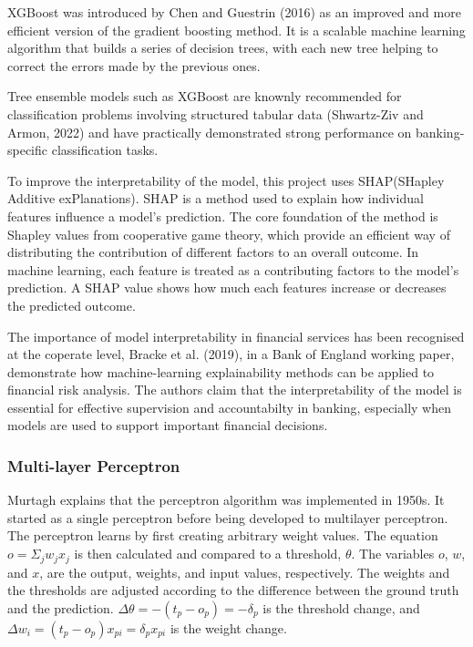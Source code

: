 \documentclass[ %
                    author={Natchalin Iwsakul \\ Inkaphol Siriwongwattana \\ Tanaphan Kummaraphat \\ Patorn Srisupap},
                supervisor={Fernando Moreno-Pino},
                    degree={MSc},
                     title={Propensity Modelling for SME Commercial Lending Using Open Public Data},
                  subtitle={Companies House filings and GDELT media coverage as predictors of first-time borrowing},
                      type={},
                      year={2026}]{dissertation}
\begin{document}
XGBoost was introduced by Chen and Guestrin (2016) as an improved and more efficient version of the gradient boosting method. It is a scalable machine learning algorithm that builds a series of decision trees, with each new tree helping to correct the errors made by the previous ones. 

Tree ensemble models such as XGBoost are knownly recommended for classification problems involving structured tabular data (Shwartz-Ziv and Armon, 2022) and have practically demonstrated strong performance on banking-specific classification tasks.

To improve the interpretability of the model, this project uses SHAP(SHapley Additive exPlanations). SHAP is a method used to explain how individual features influence a model's prediction. The core foundation of the method is Shapley values from cooperative game theory, which provide an efficient way of distributing the contribution of different factors to an overall outcome. 
In machine learning, each feature is treated as a contributing factors to the model's prediction. A SHAP value shows how much each features increase or decreases the predicted outcome.

The importance of model interpretability in financial services has been recognised at the coperate level, Bracke et al. (2019), in a Bank of England working paper, demonstrate how machine-learning explainability methods can be applied to financial risk analysis. The authors claim that the interpretability of the model is essential for effective supervision and accountabilty in banking, especially when models are used to support important financial decisions.
\label{sec:xgboost}

\subsubsection{Multi-layer Perceptron}
\label{sec:neuralnetwork}

Murtagh \cite{murtagh_multilayer_1991} explains that the perceptron algorithm was implemented in 1950s. It started as a single perceptron before being developed to multilayer perceptron. The perceptron learns by first creating arbitrary weight values. The equation \(o = \Sigma_j w_j x_j\) is then calculated and compared to a threshold, \(\theta\). The variables \(o\), \(w\), and \(x\), are the output, weights, and input values, respectively. The weights and the thresholds are adjusted according to the difference between the ground truth and the prediction. \(\Delta\theta = -(t_p - o_p) = -\delta_p\) is the threshold change, and \(\Delta w_i = (t_p - o_p)x_{pi} = \delta_px_{pi}\) is the weight change.
\end{document}
